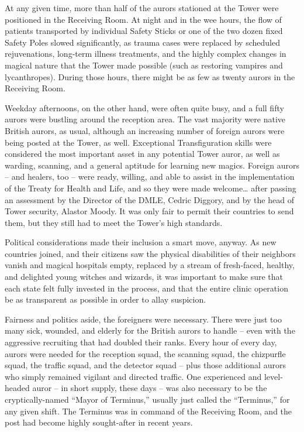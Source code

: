 \mybreak

At any given time, more than half of the aurors stationed at the Tower
were positioned in the Receiving Room. At night and in the wee hours,
the flow of patients transported by individual Safety Sticks or one of
the two dozen fixed Safety Poles slowed significantly, as trauma cases
were replaced by scheduled rejuvenations, long-term illness treatments,
and the highly complex changes in magical nature that the Tower made
possible (such as restoring vampires and lycanthropes). During those
hours, there might be as few as twenty aurors in the Receiving Room.

Weekday afternoons, on the other hand, were often quite busy, and a full
fifty aurors were bustling around the reception area. The vast majority
were native British aurors, as usual, although an increasing number of
foreign aurors were being posted at the Tower, as well. Exceptional
Transfiguration skills were considered the most important asset in any
potential Tower auror, as well as warding, scanning, and a general
aptitude for learning new magics. Foreign aurors -- and healers, too --
were ready, willing, and able to assist in the implementation of the
Treaty for Health and Life, and so they were made welcome\ldots{} after
passing an assessment by the Director of the DMLE, Cedric Diggory, and
by the head of Tower security, Alastor Moody. It was only fair to permit
their countries to send them, but they still had to meet the Tower's
high standards.

Political considerations made their inclusion a smart move, anyway. As
new countries joined, and their citizens saw the physical disabilities
of their neighbors vanish and magical hospitals empty, replaced by a
stream of fresh-faced, healthy, and delighted young witches and wizards,
it was important to make sure that each state felt fully invested in the
process, and that the entire clinic operation be as transparent as
possible in order to allay suspicion.

Fairness and politics aside, the foreigners were necessary. There were
just too many sick, wounded, and elderly for the British aurors to
handle -- even with the aggressive recruiting that had doubled their
ranks. Every hour of every day, aurors were needed for the reception
squad, the scanning squad, the chizpurfle squad, the traffic squad, and
the detector squad -- plus those additional aurors who simply remained
vigilant and directed traffic. One experienced and level-headed auror --
in short supply, these days -- was also necessary to be the
cryptically-named ``Mayor of Terminus,'' usually just called the
``Terminus,'' for any given shift. The Terminus was in command of the
Receiving Room, and the post had become highly sought-after in recent
years.

